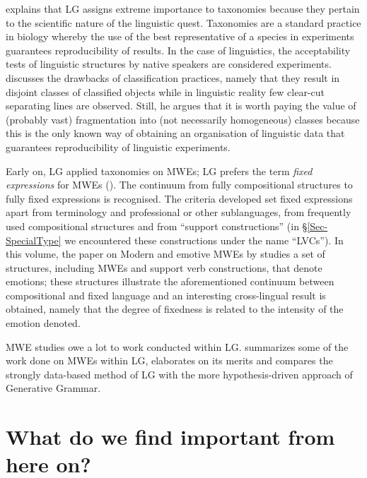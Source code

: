 \documentclass[output=paper]{langsci/langscibook}
\begin{document}
\cite{Gross:77} explains that LG assigns extreme importance to taxonomies
because they pertain to the scientific nature of the linguistic quest. Taxonomies
are a standard practice in biology whereby the use of the best representative
of a species in experiments guarantees reproducibility of results. In the case
of linguistics, the acceptability tests of linguistic structures by native speakers
are considered experiments. \cite{Gross:78} discusses the drawbacks of classification
practices, namely that they result in disjoint classes of classified objects while
in linguistic reality few clear-cut separating lines are observed. Still, he argues
that it is worth paying the value of (probably vast) fragmentation into (not necessarily
homogeneous) classes because this is the only known way of obtaining
an organisation of linguistic data that guarantees reproducibility of linguistic
experiments.


Early on, LG applied taxonomies  on MWEs; LG prefers the term {\em fixed expressions}   for MWEs (\citealt{gross1982,Gross1988a,Gross1988b}). The continuum from fully compositional structures to fully fixed expressions is recognised.  The criteria developed set fixed expressions apart from terminology and professional or other sublanguages, from frequently used compositional structures and from ``support constructions'' (in   §\ref{Sec-SpecialType}  we  encountered these constructions under the name   ``LVCs''). In this volume, the paper on Modern  and  emotive MWEs by 
\citeauthor{FotopoulouGiouli2018tv}
studies a set of structures, including MWEs and support verb constructions, that denote emotions; these structures illustrate the aforementioned continuum between compositional and fixed language and an interesting cross-lingual result is obtained, namely that the degree of fixedness is related to the intensity of the emotion denoted.

MWE studies owe a lot to work conducted within LG. 
 summarizes some of the work done on MWEs within LG, elaborates on its merits and compares the strongly data-based method of LG with the more hypothesis-driven approach of Generative Grammar. 


\largerpage
\section{What do we find important from here on?}
\label{Sec-Future}
\end{document}

